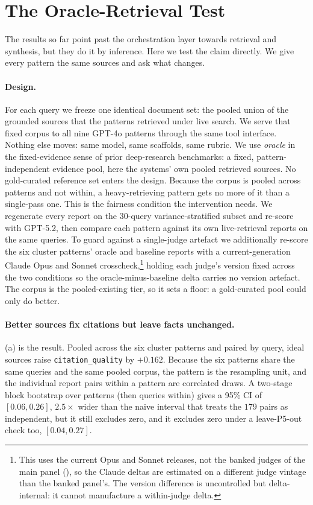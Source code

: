 \documentclass[11pt]{article}
\newcommand{\dimrow}[1]{\texttt{#1}}
\begin{document}
\section{The Oracle-Retrieval Test}\label{sec:oracle}

The results so far point past the orchestration layer towards retrieval and synthesis, but
they do it by inference. Here we test the claim directly. We give every pattern the same
sources and ask what changes.

\paragraph{Design.} For each query we freeze one identical document set: the pooled union
of the grounded sources that the patterns retrieved under live search. We serve that fixed
corpus to all nine GPT-4o patterns through the same tool interface. Nothing else moves:
same model, same scaffolds, same rubric. We use \emph{oracle} in the fixed-evidence sense of
prior deep-research benchmarks: a fixed, pattern-independent evidence pool, here the systems'
own pooled retrieved sources. No gold-curated reference set enters the design. Because the corpus is pooled
across patterns and not within, a heavy-retrieving pattern gets no more of it than a
single-pass one. This is the fairness condition the intervention needs. We regenerate every
report on the $30$-query variance-stratified subset and re-score with GPT-5.2, then compare
each pattern against its own live-retrieval reports on the same queries. To guard against a
single-judge artefact we additionally re-score the six cluster patterns' oracle and baseline
reports with a current-generation Claude Opus and Sonnet crosscheck,\footnote{This uses the
current Opus and Sonnet releases, not the banked judges of the main panel
(), so the Claude deltas are estimated on a different judge vintage than the
banked panel's. The version difference is uncontrolled but delta-internal: it cannot
manufacture a within-judge delta.} holding each judge's version fixed across the two
conditions so the oracle-minus-baseline delta carries no version artefact. The corpus is the
pooled-existing tier, so it sets a floor: a gold-curated pool could only do better.

\paragraph{Better sources fix citations but leave facts unchanged.} (a) is the result. Pooled
across the six cluster patterns and paired by query, ideal sources raise
\dimrow{citation\_quality} by $+0.162$. Because the six patterns share the same queries and
the same pooled corpus, the pattern is the resampling unit, and the individual report pairs
within a pattern are correlated draws. A two-stage block bootstrap over patterns (then queries within) gives a
95\% CI of $[0.06, 0.26]$, $2.5\times$ wider than the naive interval that
treats the $179$ pairs as independent, but it still excludes zero, and it excludes zero
under a leave-P5-out check too, $[0.04, 0.27]$.
\end{document}
